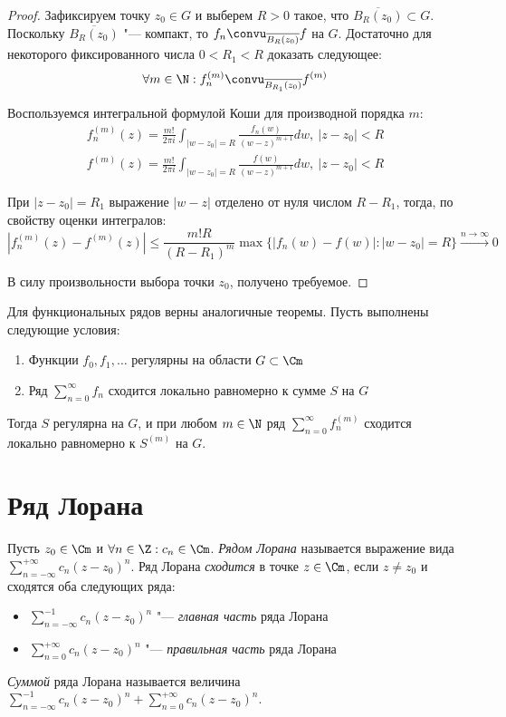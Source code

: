 \begin{proof}
	Зафиксируем точку $z_0 \in G$ и выберем $R > 0$ такое, что $\overline{B_R(z_0)} \subset G$. Поскольку $\overline{B_R(z_0)}$ "--- компакт, то $f_n \convu_{\overline{B_R(z_0)}} f$ на $G$. Достаточно для некоторого фиксированного числа $0 < R_1 < R$ доказать следующее:
	\[\forall m \in \N: f_n^{(m)} \convu_{\overline{B_{R_1}(z_0)}} f^{(m)}\]
	
	Воспользуемся интегральной формулой Коши для производной порядка $m$:
	\begin{gather*}
		f_n^{(m)}(z) = \frac{m!}{2\pi i}\int_{|w - z_0| = R}\frac{f_n(w)}{(w - z)^{m+1}}dw,~|z - z_0| < R\\
		f^{(m)}(z) = \frac{m!}{2\pi i}\int_{|w - z_0| = R}\frac{f(w)}{(w - z)^{m+1}}dw,~|z - z_0| < R
	\end{gather*}
	
	При $|z - z_0| = R_1$ выражение $|w - z|$ отделено от нуля числом $R - R_1$, тогда, по свойству оценки интегралов:
	\[|f_n^{(m)}(z) - f^{(m)}(z)| \le \frac{m!R}{(R - R_1)^m}\max\{|f_n(w) - f(w)| : |w - z_0| = R\} \xrightarrow{n \to \infty} 0\]
	
	В силу произвольности выбора точки $z_0$, получено требуемое.
\end{proof}

\begin{note}
	Для функциональных рядов верны аналогичные теоремы. Пусть выполнены следующие условия:
	\begin{enumerate}
		\item Функции $f_0, f_1, \dotsc$ регулярны на области $G \subset \Cm$
		\item Ряд $\sum_{n=0}^\infty f_n$ сходится локально равномерно к сумме $S$ на $G$
	\end{enumerate}
	
	Тогда $S$ регулярна на $G$, и при любом $m \in \N$ ряд $\sum_{n=0}^\infty f_n^{(m)}$ сходится локально равномерно к $S^{(m)}$ на $G$.
\end{note}

\section{Ряд Лорана}

\begin{definition}
	Пусть $z_0 \in \Cm$ и $\forall n \in \Z: c_n \in \Cm$. \textit{Рядом Лорана} называется выражение вида $\sum_{n = -\infty}^{+\infty}c_n(z - z_0)^n$. Ряд Лорана \textit{сходится} в точке $z \in \Cm$, если $z \ne z_0$ и сходятся оба следующих ряда:
	\begin{itemize}
		\item $\sum_{n = -\infty}^{-1}c_n(z - z_0)^n$ "--- \textit{главная часть} ряда Лорана
		\item $\sum_{n = 0}^{+\infty}c_n(z - z_0)^n$ "--- \textit{правильная часть} ряда Лорана
	\end{itemize}
	
	\textit{Суммой} ряда Лорана называется величина $\sum_{n = -\infty}^{-1}c_n(z - z_0)^n + \sum_{n = 0}^{+\infty}c_n(z - z_0)^n$.
\end{definition}

